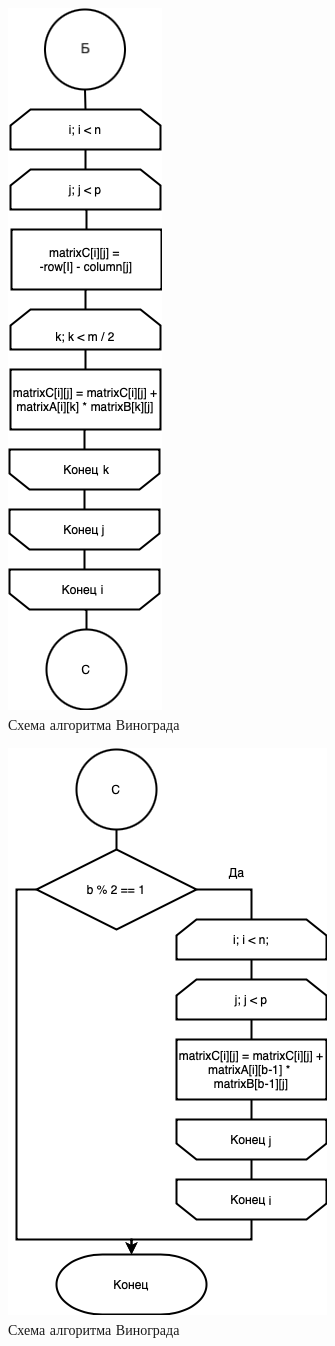 \begin{figure}[h]
    \centering
    \includegraphics[width=0.22\linewidth]{img/WinogradPrC.png}
    \caption{Схема алгоритма Винограда}
    \label{fig:mpr6}
\end{figure}

\begin{figure}[h]
    \centering
    \includegraphics[width=0.4\linewidth]{img/WinogradPrD.png}
    \caption{Схема алгоритма Винограда}
    \label{fig:mpr1}
\end{figure}

